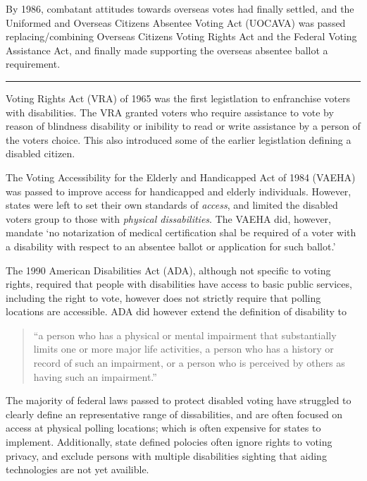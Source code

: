 By 1986, combatant attitudes towards overseas votes had finally settled, and the Uniformed and Overseas Citizens Absentee Voting Act (UOCAVA) was passed replacing/combining Overseas Citizens Voting Rights Act and the Federal Voting Assistance Act, and finally made supporting the overseas absentee ballot a requirement.

\hspace{2em}
\hrule
\hspace{2em}

Voting Rights Act (VRA) of 1965 was the first legistlation to enfranchise voters with disabilities. The VRA granted voters who require assistance to vote by reason of blindness disability or inibility to read or write assistance by a person of the voters choice. This also introduced some of the earlier legistlation defining a disabled citizen.

The Voting Accessibility for the Elderly and Handicapped Act of 1984 (VAEHA) was passed to improve access for handicapped and elderly individuals. However, states were left to set their own standards of {\em access}, and limited the disabled voters group to those with {\em physical dissabilities}. The VAEHA did, however, mandate `no notarization of medical certification shal be required of a voter with a disability with respect to an absentee ballot or application for such ballot.'

The 1990 American Disabilities Act (ADA), although not specific to voting rights, required that people with disabilities have access to basic public services, including the right to vote, however does not strictly require that polling locations are accessible. ADA did however extend the definition of disability to 
\begin{quote}``a person who has a physical or mental impairment that substantially limits one or more major life activities, a person who has a history or record of such an impairment, or a person who is perceived by others as having such an impairment.''
\end{quote}

The majority of federal laws passed to protect disabled voting have struggled to clearly define an representative range of dissabilities, and are often focused on access at physical polling locations; which is often expensive for states to implement. Additionally, state defined polocies often ignore rights to voting privacy, and exclude persons with multiple disabilities sighting that aiding technologies are not yet availible.


